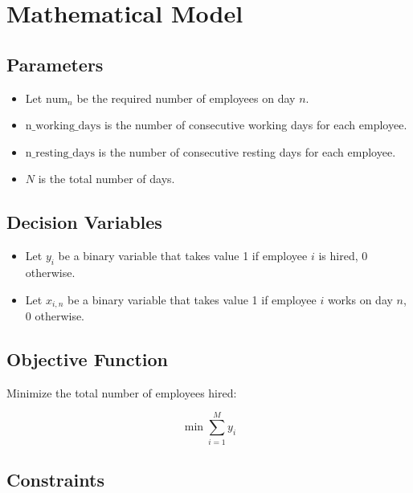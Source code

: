 \documentclass{article}
\begin{document}
\section*{Mathematical Model}

\subsection*{Parameters}

\begin{itemize}
    \item Let \( \text{num}_n \) be the required number of employees on day \( n \).
    \item \( \text{n\_working\_days} \) is the number of consecutive working days for each employee.
    \item \( \text{n\_resting\_days} \) is the number of consecutive resting days for each employee.
    \item \( N \) is the total number of days.
\end{itemize}

\subsection*{Decision Variables}

\begin{itemize}
    \item Let \( y_i \) be a binary variable that takes value 1 if employee \( i \) is hired, 0 otherwise.
    \item Let \( x_{i,n} \) be a binary variable that takes value 1 if employee \( i \) works on day \( n \), 0 otherwise.
\end{itemize}

\subsection*{Objective Function}

Minimize the total number of employees hired:

\[
\min \sum_{i=1}^{M} y_i
\]

\subsection*{Constraints}
\end{document}
